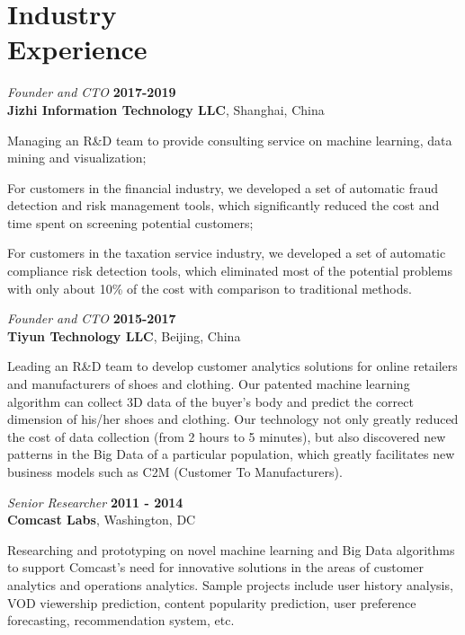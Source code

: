 \documentclass[margin,line]{resume}
\begin{document}
\begin{resume}
\begin{list2}
         \end{list2}
         
    \section{\mysidestyle Industry\\Experience}
         \textsl{Founder and CTO} \hfill \textbf{2017-2019}\\
         \textbf{Jizhi Information Technology LLC}, Shanghai, China
         \begin{list2}
               \item Managing an R\&D team to provide consulting service on machine learning, data mining and visualization; 
               \item For customers in the financial industry, we developed a set of automatic fraud detection and risk management tools, which significantly reduced the cost and time spent on screening potential customers;
               \item For customers in the taxation service industry, we developed a set of automatic compliance risk detection tools, which eliminated most of the potential problems with only about 10\% of the cost with comparison to traditional methods.
         \end{list2}

         \textsl{Founder and CTO} \hfill \textbf{2015-2017}\\
         \textbf{Tiyun Technology LLC}, Beijing, China
         \begin{list2}
               \item Leading an R\&D team to develop customer analytics solutions for online retailers and manufacturers of shoes and clothing. Our patented machine learning algorithm can collect 3D data of the buyer's body and predict the correct dimension of his/her shoes and clothing. Our technology not only greatly reduced the cost of data collection (from 2 hours to 5 minutes), but also discovered new patterns in the Big Data of a particular population, which greatly facilitates new business models such as C2M (Customer To Manufacturers). 
         \end{list2}

         \textsl{Senior Researcher} \hfill \textbf{2011 - 2014}\\
         \textbf{Comcast Labs}, Washington, DC
         \begin{list2}
               \item Researching and prototyping on novel machine learning and Big Data algorithms to support Comcast's need for innovative solutions in the areas of customer analytics and operations analytics. Sample projects include user history analysis, VOD viewership prediction, content popularity prediction, user preference forecasting, recommendation system, etc.
         \end{list2}
             

\end{resume}
\end{document}
